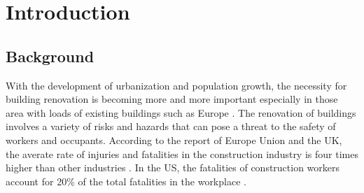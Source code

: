 \section{Introduction}
\label{sec:introduction}
\subsection*{Background}
\label{sec:background}
With the development of urbanization and population growth, 
the necessity for building renovation is becoming more and more important especially in those area with loads of existing buildings such as Europe \cite[]{jensen2015value}.
The renovation of buildings involves a variety of risks and hazards that can pose a threat to the safety of workers and occupants.
According to the report of Europe Union and the UK, 
the averate rate of injuries and fatalities in the construction industry is four times higher than other industries \cite[]{estudillo2024role,britain2001health}. 
In the US, the fatalities of construction workers account for 20\% of the total fatalities in the workplace \cite[]{kim2016integrating}.

